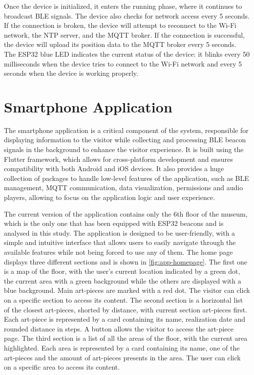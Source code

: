 Once the device is initialized, it enters the running phase, where it continues to broadcast BLE signals. The device also checks for network access every 5 seconds. If the connection is broken, the device will attempt to reconnect to the Wi-Fi network, the NTP server, and the MQTT broker. If the connection is successful, the device will upload its position data to the MQTT broker every 5 seconds. The ESP32 blue LED indicates the current status of the device: it blinks every 50 milliseconds when the device tries to connect to the Wi-Fi network and every 5 seconds when the device is working properly.

\section{Smartphone Application}
The smartphone application is a critical component of the system, responsible for displaying information to the visitor while collecting and processing BLE beacon signals in the background to enhance the visitor experience. It is built using the Flutter framework, which allows for cross-platform development and ensures compatibility with both Android and iOS devices. It also provides a huge collection of packages to handle low-level features of the application, such as BLE management, MQTT communication, data visualization, permissions and audio players, allowing to focus on the application logic and user experience.

The current version of the application contains only the 6th floor of the museum, which is the only one that has been equipped with ESP32 beacons and is analysed in this study. The application is designed to be user-friendly, with a simple and intuitive interface that allows users to easily navigate through the available features while not being forced to use any of them. The home page displays three different sections and is shown in \autoref{fig:app-homepage}. The first one is a map of the floor, with the user's current location indicated by a green dot, the current area with a green background while the others are displayed with a blue background. Main art-pieces are marked with a red dot. The visitor can click on a specific section to access its content. The second section is a horizontal list of the closest art-pieces, shorted by distance, with current section art-pieces first. Each art-piece is represented by a card containing its name, realization date and rounded distance in steps. A button allows the visitor to access the art-piece page. The third section is a list of all the areas of the floor, with the current area highlighted. Each area is represented by a card containing its name, one of the art-pieces and the amount of art-pieces presents in the area. The user can click on a specific area to access its content. 

